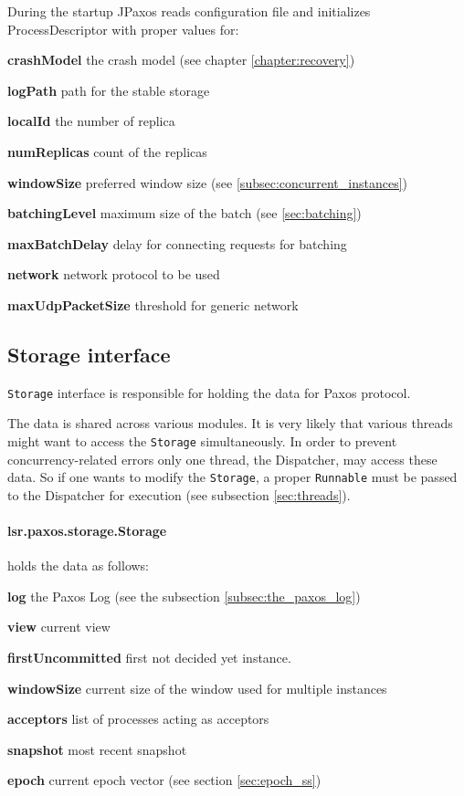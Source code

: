 During the startup JPaxos reads configuration file and initializes ProcessDescriptor with proper values for:
\begin{tightList}[\setlength{\labelwidth}{0em}]
 \item[\textbf{crashModel}] the crash model (see chapter \ref{chapter:recovery})
 \item[\textbf{logPath}] path for the stable storage
 \item[\textbf{localId}] the number of replica
 \item[\textbf{numReplicas}] count of the replicas
 \item[\textbf{windowSize}] preferred window size (see \ref{subsec:concurrent_instances})
 \item[\textbf{batchingLevel}] maximum size of the batch (see \ref{sec:batching})
 \item[\textbf{maxBatchDelay}] delay for connecting requests for batching
 \item[\textbf{network}] network protocol to be used
 \item[\textbf{maxUdpPacketSize}] threshold for generic network
\end{tightList}

\subsection{Storage interface}
\label{subsec:storage_interface}

\texttt{Storage} interface is responsible for holding the data for Paxos
protocol.

The data is shared across various modules.
It is very likely that various threads might want to access the \texttt{Storage} simultaneously. In order to prevent concurrency-related errors only one thread, the Dispatcher, may access these data. So if one wants to modify the \texttt{Storage}, a proper \texttt{Runnable} must be passed to the Dispatcher for execution (see subsection \ref{sec:threads}).

\paragraph{\normalfont \ttfamily lsr.paxos.storage.Storage}
holds the data as follows:
\begin{tightList}[\setlength{\labelwidth}{0em}]
  \item[\textbf{log}] the Paxos Log (see the subsection \ref{subsec:the_paxos_log})
  \item[\textbf{view}] current view
  \item[\textbf{firstUncommitted}] first not decided yet instance.
  \item[\textbf{windowSize}] current size of the window used for multiple instances
  \item[\textbf{acceptors}] list of processes acting as acceptors
  \item[\textbf{snapshot}] most recent snapshot
  \item[\textbf{epoch}] current epoch vector (see section \ref{sec:epoch_ss})
\end{tightList}

